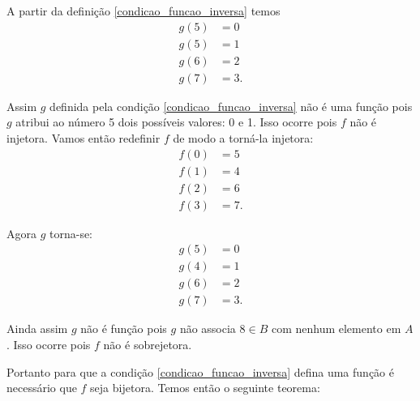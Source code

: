 A partir da definição \eqref{condicao_funcao_inversa} temos
\begin{align*}
	g(5) &= 0\\
	g(5) &= 1\\
	g(6) &= 2\\
	g(7) &= 3.
\end{align*}

Assim $g$ definida pela condição \eqref{condicao_funcao_inversa} não é uma função pois $g$ atribui ao número 5 dois possíveis valores: 0 e 1. Isso ocorre pois $f$ não é injetora. Vamos então redefinir $f$ de modo a torná-la injetora:
\begin{align*}
	f(0) &= 5\\
	f(1) &= 4\\
	f(2) &= 6\\
	f(3) &= 7.	
\end{align*}

Agora $g$ torna-se:
\begin{align*}
	g(5) &= 0\\
	g(4) &= 1\\
	g(6) &= 2\\
	g(7) &= 3.
\end{align*}

Ainda assim $g$ não é função pois $g$ não associa $8 \in B$ com nenhum elemento em $A$. Isso ocorre pois $f$ não é sobrejetora.

Portanto para que a condição \eqref{condicao_funcao_inversa} defina uma função é necessário que $f$ seja bijetora. Temos então o seguinte teorema:

